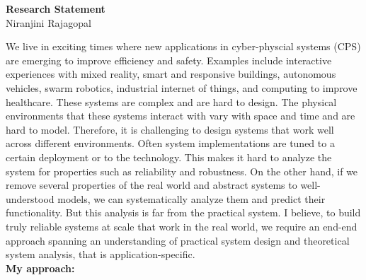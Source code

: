 \documentclass[10pt]{article}
\date{}
\begin{document}
\begin{center}
{\LARGE \bf Research Statement}\\
\vspace*{0.1cm}
{\normalsize Niranjini Rajagopal}
\end{center}




We live in exciting times where new applications in cyber-physcial systems (CPS) are emerging to improve efficiency and safety. Examples include interactive experiences with mixed reality, smart and responsive buildings, autonomous vehicles, swarm robotics, industrial internet of things, and computing to improve healthcare. These systems are complex and are hard to design. The physical environments that these systems interact with vary with space and time and are hard to model. Therefore, it is challenging to design systems that work well across different environments. Often system implementations are tuned to a certain deployment or to the technology. This makes it hard to analyze the system for properties such as reliability and robustness. On the other hand, if we remove several properties of the real world and abstract systems to well-understood models, we can systematically analyze them and predict their functionality. But this analysis is far from the practical system. I believe,  to build truly reliable systems at scale that work in the real world, we require an end-end approach spanning an understanding of practical system design and theoretical system analysis, that is application-specific.\\


\textbf{My approach:}\\
\end{document}
